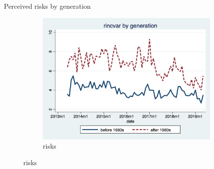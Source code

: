 \documentclass{beamer}
\begin{document}
\begin{frame}{Perceived risks by generation}
	\begin{figure}[ht]
		\label{ts_incvar_byear_g_mean}
		\begin{subfigure}[b]{0.46\textwidth}
			\centering
			\caption{risks}
			\includegraphics[width=\textwidth, height = 0.33\textheight]{figures/ts_rincvar_byear_g_median.png}
		\end{subfigure}
	\end{figure}
\end{frame}





\end{document}
